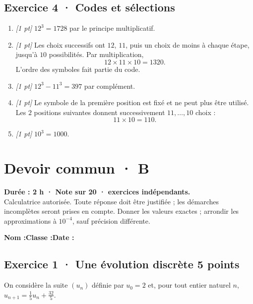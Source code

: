 \subsection*{Exercice 4 · Codes et sélections}\begin{enumerate}

\item \textit{[1 pt]} $12^3=1728$ par le principe multiplicatif.

\item \textit{[1 pt]} Les choix successifs ont $12$, $11$, puis un choix de moins à chaque étape, jusqu'à $10$ possibilités. Par multiplication,
\[12\times11\times10=1320.\]
L'ordre des symboles fait partie du code.

\item \textit{[1 pt]} $12^3-11^3=397$ par complément.

\item \textit{[1 pt]} Le symbole de la première position est fixé et ne peut plus être utilisé. Les $2$ positions suivantes donnent successivement $11,\ldots,10$ choix :
\[11\times10=110.\]

\item \textit{[1 pt]} $10^3=1000$.

\end{enumerate}

\fi

\fi

\ifmxteacher

\mxnewpage{}\label{sujet:3-4}

\section*{Devoir commun · B}


\textbf{Durée : 2 h · Note sur 20 ·  exercices indépendants.}\\Calculatrice autorisée. Toute réponse doit être justifiée ; les démarches incomplètes seront prises en compte. Donner les valeurs exactes ; arrondir les approximations à $10^{-4}$, sauf précision différente.

\smallskip\textbf{Nom :}\enspace\dotfill\quad\textbf{Classe :}\enspace\dotfill\quad\textbf{Date :}\enspace\dotfill

\subsection*{Exercice 1 · Une évolution discrète \hfill 5 points}On considère la suite $(u_n)$ définie par $u_0=2$ et, pour tout entier naturel $n$, $u_{n+1}=\frac{1}{5}u_n+\frac{32}{5}$.

